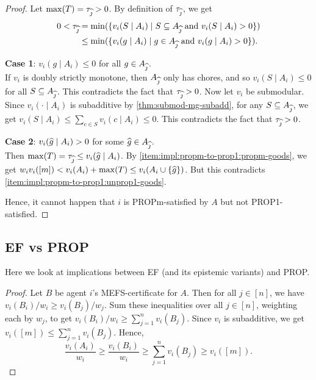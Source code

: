 \begin{proof}
Let $\max(T) = \tau_{\widehat{\jmath}} > 0$. By definition of $\tau_{\widehat{\jmath}}$, we get
\begin{align*}
0 < \tau_{\widehat{\jmath}} &= \min(\{v_i(S \mid A_i) \mid S \subseteq A_{\widehat{\jmath}} \textrm{ and } v_i(S \mid A_i) > 0\})
\\ &\le \min(\{v_i(g \mid A_i) \mid g \in A_{\widehat{\jmath}} \textrm{ and } v_i(g \mid A_i) > 0\}).
\end{align*}

\textbf{Case 1}: $v_i(g \mid A_i) \le 0$ for all $g \in A_{\widehat{\jmath}}$.
\\ If $v_i$ is doubly strictly monotone, then $A_{\widehat{\jmath}}$ only has chores,
and so $v_i(S \mid A_i) \le 0$ for all $S \subseteq A_{\widehat{\jmath}}$.
This contradicts the fact that $\tau_{\widehat{\jmath}} > 0$.
Now let $v_i$ be submodular.
Since $v_i(\cdot \mid A_i)$ is subadditive by \cref{thm:submod-mg-subadd},
for any $S \subseteq A_{\widehat{\jmath}}$, we get
$v_i(S \mid A_i) \le \sum_{c \in S} v_i(c \mid A_i) \le 0$.
This contradicts the fact that $\tau_{\widehat{\jmath}} > 0$.

\textbf{Case 2}: $v_i(\widehat{g} \mid A_i) > 0$ for some $\widehat{g} \in A_{\widehat{\jmath}}$.
\\ Then $\max(T) = \tau_{\widehat{\jmath}} \le v_i(\widehat{g} \mid A_i)$.
By \ref{item:impl:propm-to-prop1:propm-goods}, we get
$w_iv_i([m]) < v_i(A_i) + \max(T) \le v_i(A_i \cup \{\widehat{g}\})$.
But this contradicts \ref{item:impl:propm-to-prop1:unprop1-goods}.

Hence, it cannot happen that $i$ is PROPm-satisfied by $A$ but not PROP1-satisfied.
\end{proof}

\subsection{EF vs PROP}
\label{sec:impls-extra:ef-vs-prop}

Here we look at implications between EF (and its epistemic variants) and PROP.

\begin{proof}
Let $B$ be agent $i$'s MEFS-certificate for $A$.
Then for all $j \in [n]$, we have $v_i(B_i)/w_i \ge v_i(B_j)/w_j$.
Sum these inequalities over all $j \in [n]$, weighting each by $w_j$,
to get $v_i(B_i)/w_i \ge \sum_{j=1}^n v_i(B_j)$.
Since $v_i$ is subadditive, we get $v_i([m]) \le \sum_{j=1}^n v_i(B_j)$.
Hence,
\[ \frac{v_i(A_i)}{w_i} \ge \frac{v_i(B_i)}{w_i} \ge \sum_{j=1}^n v_i(B_j) \ge v_i([m]). \]
\end{proof}


